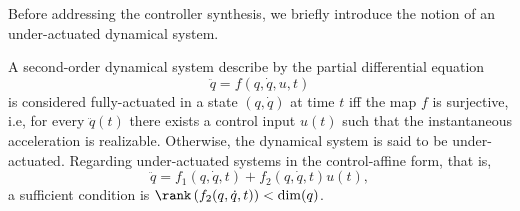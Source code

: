 


Before addressing the controller synthesis, we briefly introduce the notion of an under-actuated dynamical system.

\begin{definition}
A second-order dynamical system describe by the partial differential equation
\begin{equation}
\ddot{q} = f(q,\dot{q},u,t)
\end{equation}
is considered fully-actuated in a state $(q,\dot{q})$ at time $t$ iff the map $f$ is surjective, i.e, for every $\ddot{q}(t)$ there exists a control input $u(t)$ such that the instantaneous acceleration is realizable. Otherwise, the dynamical system is said to be under-actuated. Regarding under-actuated systems in the control-affine form, that is,
\begin{equation}
\ddot{q} = f_1(q,\dot{q},t) + f_2(q,\dot{q},t)u(t),
\end{equation}
a sufficient condition is $\rank \left(f_2(q,\dot{q},t)\right) < \dim(q)$.
\end{definition}

